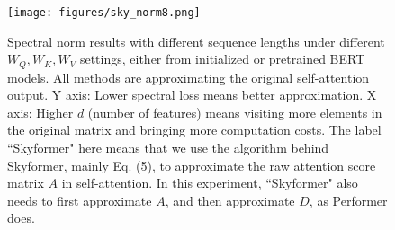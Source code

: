 \begin{figure}[htbp]
\centering
\texttt{[image: figures/sky\_norm8.png]}
\caption{
Spectral norm results with different sequence lengths under different $W_Q, W_K, W_V$ settings, either from initialized or pretrained BERT models. 
All methods are approximating the original self-attention output.
Y axis: Lower spectral loss means better approximation. 
X axis: Higher $d$ (number of features) means visiting more elements in the original matrix and bringing more computation costs.
The label ``Skyformer" here means that we use the algorithm behind Skyformer, mainly Eq. (5), to approximate the raw attention score matrix $A$ in self-attention. In this experiment, ``Skyformer" also needs to first approximate $A$, and then approximate $D$, as Performer does. 
}
\label{fig:norm}
\end{figure}